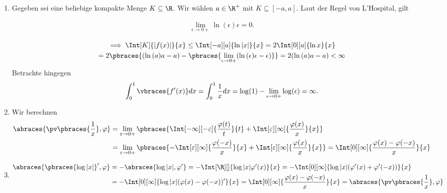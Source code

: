 
\begin{solution}

\phantom{}

\begin{enumerate}[label = (\roman*)]

    \item Gegeben sei eine beliebige kompakte Menge $K \subseteq \R$.
    Wir wählen $a \in \R^+$ mit $K \subseteq [-a, a]$.
    Laut der Regel von L'Hospital, gilt

    \begin{align*}
        \lim_{\epsilon \to 0+}
        \ln{(\epsilon)} \epsilon = 0.
    \end{align*}

    \begin{multline*}
        \implies
        \Int[K]{|f(x)|}{x}
        \leq
        \Int[-a][a]{\ln{|x|}}{x}
        =
        2 \Int[0][a]{\ln{x}}{x} \\
        =
        2 \pbraces
        {
            (\ln{(a)} a - a)
            -
            \pbraces
            {
                \lim_{\epsilon \to 0+}
                (\ln{(\epsilon)} \epsilon - \epsilon)
            }
        }
        =
        2 (\ln{(a)} a - a) < \infty
	\end{multline*}
	Betrachte hingegen 
	\begin{align*}
	\int_0^1 \vbraces{f^\prime(x)} dx = \int_0^1 \frac{1}{x} dx = \log(1) - \lim_{\epsilon \to 0+} \log(\epsilon) = \infty.
	\end{align*}
	\item Wir berechnen
	\begin{align*}
	\abraces{\pv\pbraces{\frac{1}{x}}, \varphi} &= \lim_{\varepsilon \to 0+}
	\pbraces
	{
		\Int[-\infty][-\varepsilon]
		{
			\frac{\varphi(t)}{t}
		}{t}
		+
		\Int[\varepsilon][\infty]
		{
			\frac{\varphi(x)}{x}
		}{x}
	} \\
	&= \lim_{\varepsilon \to 0+}
	\pbraces
	{
	-\Int[\varepsilon][\infty]
	{
		\frac{\varphi(-x)}{x}
	}{x}
	+
	\Int[\varepsilon][\infty]
	{
		\frac{\varphi(x)}{x}
	}{x}
	} = \Int[0][\infty]{\frac{\varphi(x) - \varphi(-x)}{x}}{x}
	\end{align*}
	\item 
	\begin{align*}
	\abraces{\pbraces{\log|x|}^\prime, \varphi} &= -\abraces{\log|x|, \varphi^\prime} = -\Int[\R][]{\log|x| \varphi^\prime(x)}{x} = -\Int[0][\infty]{\log|x| (\varphi^\prime(x) + \varphi^\prime(-x))}{x} \\
	&= -\Int[0][\infty]{\log|x| (\varphi(x) - \varphi(-x))^\prime}{x} = \Int[0][\infty]{\frac{\varphi(x) - \varphi(-x)}{x}}{x} = \abraces{\pv\pbraces{\frac{1}{x}}, \varphi}
	\end{align*}
\end{enumerate}

\end{solution}


